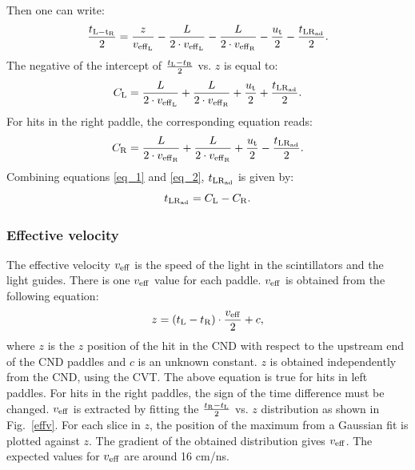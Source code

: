 Then one can write:
\begin{equation}
\frac{t_{\rm{L}-t_{\rm{R}}}}{2}=\frac{z}{v_{\rm{eff}_{\rm{L}}}}-\frac{L}{2\cdot v_{\rm{eff}_{\rm{L}}}}-\frac{L}{2\cdot v_{\rm{eff}_{\rm{R}}}}-\frac{u_{\rm{t}}}{2}-\frac{t_{\rm{LR}_{\rm{ad}}}}{2}.
\end{equation}
The negative of the intercept of $\frac{t_{\rm{L}}-t_{\rm{R}}}{2}$ vs. $z$ is equal to:
\begin{equation}
\label{eq_1}
C_{\rm{L}}=\frac{L}{2\cdot v_{\rm{eff}_{\rm{L}}}}+\frac{L}{2\cdot v_{\rm{eff}_{\rm{R}}}}+\frac{u_{\rm{t}}}{2}+\frac{t_{\rm{LR}_{\rm{ad}}}}{2}.
\end{equation}
For hits in the right paddle, the corresponding equation reads:
\begin{equation}
\label{eq_2}
C_{\rm{R}}=\frac{L}{2\cdot v_{\rm{eff}_{\rm{R}}}}+\frac{L}{2\cdot v_{\rm{eff}_{\rm{R}}}}+\frac{u_{\rm{t}}}{2}-\frac{t_{\rm{LR}_{\rm{ad}}}}{2}.
\end{equation}
Combining equations \ref{eq_1} and \ref{eq_2}, $t_{\rm{LR}_{\rm{ad}}}$ is given by:
\begin{equation}
t_{\rm{LR}_{\rm{ad}}}=C_{\rm{L}}-C_{\rm{R}}.
\end{equation}

\subsubsection{Effective velocity }

The effective velocity $v_{\rm{eff}}$ is the speed of the light in the scintillators and the light guides. There is one $v_{\rm{eff}}$ value for each paddle. $v_{\rm{eff}}$ is obtained from the following equation:
\begin{equation}
z=(t_{\rm{L}}-t_{\rm{R}})\cdot \frac{v_{\rm{eff}}}{2} + c,
\end{equation}
where $z$ is the $z$ position of the hit in the CND with respect to the upstream end of the CND paddles and $c$ is an unknown constant. $z$ is obtained independently from the CND, using the CVT. The above equation is true for hits in left paddles. For hits in the right paddles, the sign of the time difference must be changed. $v_{\rm{eff}}$ is extracted by fitting the $\frac{t_{\rm{R}}-t_{\rm{L}}}{2}$ vs. $z$ distribution as shown in Fig.~\ref{effv}. For each slice in $z$, the position of the maximum from a Gaussian fit is plotted against $z$. The gradient of the obtained distribution gives $v_{\rm{eff}}$. The expected values for $v_{\rm{eff}}$ are around 16 cm/ns.

